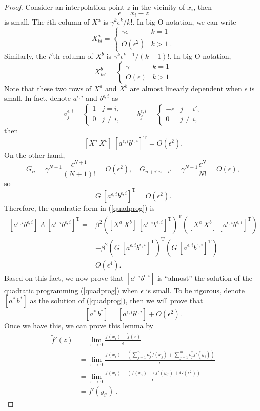 \begin{proof}
Consider an interpolation point $z$ in the vicinity of $x_i$, then
\[ \epsilon = x_i - z \]
is small.  The $i$th column of
$X^a$ is $\gamma^k \epsilon^k / k!$.  In big O notation, we can write
\[ X^a_{ki} = \begin{cases} \gamma\epsilon & k=1 \\ O(\epsilon^2) & k>1 \;.
               \end{cases}\]
Similarly, the $i'$th column of $X^b$ is $\gamma^k \epsilon^{k-1} / (k-1)!$.
In big O notation,
\[ X^b_{ki'} = \begin{cases} \gamma & k=1 \\ O(\epsilon) & k>1 \end{cases} \]
Note that these two rows of $X^a$ and $X^b$ are almost linearly dependent when
$\epsilon$ is small.  In fact, denote $a^{\epsilon,i}$ and $b^{\epsilon,i}$ as
\[ a^{\epsilon,i}_j = \begin{cases} 1 & j = i, \\ 0 & j\ne i, \end{cases} \qquad
   b^{\epsilon,i}_j = \begin{cases}
     -\epsilon & j = i', \\ 0 & j\ne i, \end{cases}\]
then
\[[X^a\,X^b]\:[a^{\epsilon,i}b^{\epsilon,i}]^{\mathrm{T}} = O(\epsilon^2). \]
On the other hand,
\[ G_{ii} = \gamma^{N+1} \frac{\epsilon^{N+1}}{(N+1)!} = O(\epsilon^2), \quad
   G_{n+i'\,n+i'} = \gamma^{N+1} \frac{\epsilon^N}{N!} = O(\epsilon) ,\]
so
\[ G\:[a^{\epsilon,i}b^{\epsilon,i}]^{\mathrm{T}} = O(\epsilon^2) . \]
Therefore, the quadratic form in (\ref{quadprog}) is
\[\begin{split}
   [a^{\epsilon,i} b^{\epsilon,i}]\: A\:
      [a^{\epsilon,i} b^{\epsilon,i}]^{\mathrm T} =&
   \beta^2 \left([X^a\,X^b]\:
      [a^{\epsilon,i}b^{\epsilon,i}]^{\mathrm T}\right)^{\mathrm T}
   \left([X^a\,X^b]\: [a^{\epsilon,i}b^{\epsilon,i}]^{\mathrm T}\right) \\
   &+ \beta^2 \left(G\:
      [a^{\epsilon,i}b^{\epsilon,i}]^{\mathrm T}\right)^{\mathrm T}
   \left(G\: [a^{\epsilon,i}b^{\epsilon,i}]^{\mathrm T}\right) \\
   =& O(\epsilon^4) . \end{split} \]
Based on this fact, we now prove that $[a^{\epsilon,i} b^{\epsilon,i}]$ is
``almost'' the solution of the quadratic programming (\ref{quadprog}) when
$\epsilon$ is small.  To be rigorous, denote $[a^*\,b^*]$ as the solution of
(\ref{quadprog}), then we will prove that
\[ [a^*\,b^*] = [a^{\epsilon,i} b^{\epsilon,i}] + O(\epsilon^2) . \]
Once we have this, we can prove this lemma by
\[ \begin{split}
 {\tilde f}'(z)
 &= \lim_{\epsilon\to0} \frac{f(x_i) - {\tilde f}(z)}{\epsilon} \\
 &= \lim_{\epsilon\to0} \frac{f(x_i) - \left(\sum_{j=1}^n a^*_j f(x_j)
                           + \sum_{j=1}^m b^*_j f'(y_j)\right)}{\epsilon} \\
 &= \lim_{\epsilon\to0} \frac{f(x_i) - \left(f(x_i) - \epsilon f'(y_{i'})
                           + O(\epsilon^2)\right)}{\epsilon} \\
 &= f'(y_{i'}) \;.
\end{split} \]


\end{proof}
